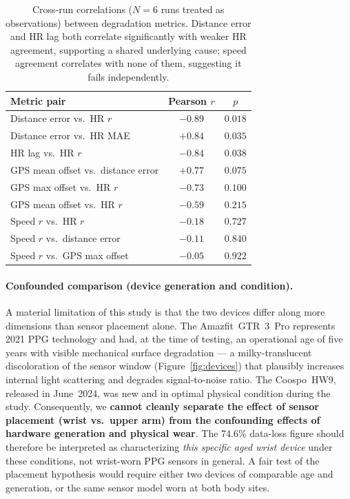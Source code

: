 \documentclass{acmsiggraph}
\begin{document}
	\begin{table}[!htb]
		\centering
		\caption{Cross-run correlations ($N=6$ runs treated as observations)
			between degradation metrics. Distance error and HR lag both correlate
			significantly with weaker HR agreement, supporting a shared underlying
			cause; speed agreement correlates with none of them, suggesting it fails
			independently.}
		\label{tab:correlations}
		\small
		\begin{tabular}{lcc}
			\toprule
			Metric pair & Pearson $r$ & $p$ \\
			\midrule
			Distance error vs.\ HR $r$   & $-0.89$ & $0.018$ \\
			Distance error vs.\ HR MAE   & $+0.84$ & $0.035$ \\
			HR lag vs.\ HR $r$           & $-0.84$ & $0.038$ \\
			GPS mean offset vs.\ distance error & $+0.77$ & $0.075$ \\
			GPS max offset vs.\ HR $r$   & $-0.73$ & $0.100$ \\
			GPS mean offset vs.\ HR $r$  & $-0.59$ & $0.215$ \\
			\midrule
			Speed $r$ vs.\ HR $r$        & $-0.18$ & $0.727$ \\
			Speed $r$ vs.\ distance error & $-0.11$ & $0.840$ \\
			Speed $r$ vs.\ GPS max offset & $-0.05$ & $0.922$ \\
			\bottomrule
		\end{tabular}
	\end{table}
	
	\medskip
	\paragraph{Confounded comparison (device generation and condition).}
	A material limitation of this study is that the two devices differ along
	more dimensions than sensor placement alone. The Amazfit~GTR~3~Pro
	represents 2021 PPG technology and had, at the time of testing, an
	operational age of five years with visible mechanical surface
	degradation --- a milky-translucent discoloration of the sensor window
	(Figure~\ref{fig:devices}) that plausibly increases internal light
	scattering and degrades
	signal-to-noise ratio. The Coospo~HW9, released in June~2024, was new and
	in optimal physical condition during the study. Consequently, we
	\textbf{cannot cleanly separate the effect of sensor placement
		(wrist vs.\ upper arm) from the confounding effects of hardware
		generation and physical wear}. The 74.6\% data-loss figure should
	therefore be interpreted as characterizing \emph{this specific aged
		wrist device} under these conditions, not wrist-worn PPG sensors in
	general. A fair test of the placement hypothesis would require either
	two devices of comparable age and generation, or the same sensor model
	worn at both body sites.
	
\end{document}
